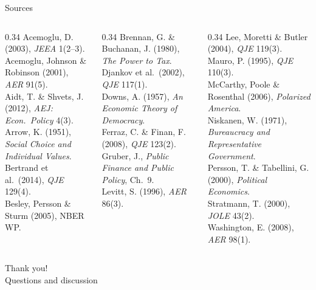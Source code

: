 \documentclass[11pt,aspectratio=169]{beamer}
\begin{document}
\begin{frame}{Sources}
  \tiny
  \begin{columns}[T]
    \begin{column}{0.34\textwidth}
      Acemoglu, D. (2003), \emph{JEEA} 1(2--3).\\
      Acemoglu, Johnson \& Robinson (2001), \emph{AER} 91(5).\\
      Aidt, T. \& Shvets, J. (2012), \emph{AEJ: Econ.\ Policy} 4(3).\\
      Arrow, K. (1951), \emph{Social Choice and Individual Values}.\\
      Bertrand et al.\ (2014), \emph{QJE} 129(4).\\
      Besley, Persson \& Sturm (2005), NBER WP.
    \end{column}
    \begin{column}{0.34\textwidth}
      Brennan, G. \& Buchanan, J. (1980), \emph{The Power to Tax}.\\
      Djankov et al.\ (2002), \emph{QJE} 117(1).\\
      Downs, A. (1957), \emph{An Economic Theory of Democracy}.\\
      Ferraz, C. \& Finan, F. (2008), \emph{QJE} 123(2).\\
      Gruber, J., \emph{Public Finance and Public Policy}, Ch.\ 9.\\
      Levitt, S. (1996), \emph{AER} 86(3).
    \end{column}
    \begin{column}{0.34\textwidth}
      Lee, Moretti \& Butler (2004), \emph{QJE} 119(3).\\
      Mauro, P. (1995), \emph{QJE} 110(3).\\
      McCarthy, Poole \& Rosenthal (2006), \emph{Polarized America}.\\
      Niskanen, W. (1971), \emph{Bureaucracy and Representative Government}.\\
      Persson, T. \& Tabellini, G. (2000), \emph{Political Economics}.\\
      Stratmann, T. (2000), \emph{JOLE} 43(2).\\
      Washington, E. (2008), \emph{AER} 98(1).
    \end{column}
  \end{columns}
\end{frame}

\begin{frame}[standout]
  Thank you!\\
  \vspace{0.5em}
  \small Questions and discussion
\end{frame}
\end{document}
